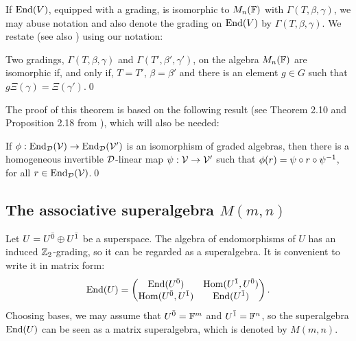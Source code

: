 If $\operatorname{End}(V)$, equipped with a grading, is isomorphic to $M_n(\mathbb{F})$ with $\Gamma(T, \beta, \gamma)$, we may abuse notation and also denote the grading on $\operatorname{End}(V)$ by $\Gamma(T,\beta,\gamma)$.
We restate \cite[Theorem 2.27]{livromicha} (see also \cite[Theorem 2.6]{BK10}) using our notation:

\begin{thm}\label{thm:classification-matrix}%
	Two gradings, $\Gamma(T,\beta,\gamma)$ and $\Gamma(T',\beta',\gamma')$, on the algebra $M_n(\mathbb{F})$ are isomorphic if, and only if, $T=T'$, $\beta=\beta'$ and there is an element $g\in G$ such that $g \Xi(\gamma)=\Xi(\gamma')$.\qed
\end{thm}

The proof of this theorem is based on the following result (see Theorem 2.10 and Proposition 2.18 from \cite{livromicha}), which will also be needed:

\begin{prop}\label{prop:inner-automorphism}
	If $\phi: \operatorname{End}_{\mathcal{D}} (\mathcal V) \rightarrow \operatorname{End}_{\mathcal{D}} (\mathcal V')$ is an isomorphism of graded algebras, then there is a homogeneous invertible 
	$\mathcal{D}$-linear map $\psi: \mathcal V\rightarrow \mathcal V'$ such that $\phi(r)=\psi \circ r \circ \psi^{-1}$, for all $r\in \operatorname{End}_{\mathcal{D}} (\mathcal V)$.\qed
\end{prop}

\subsection{The associative superalgebra $M(m,n)$}\label{M(m,n)}
Let $U = U^{\bar0} \oplus U^{\bar1}$ be a superspace.
The algebra of endomorphisms of $U$ has an induced $\mathbb{Z}_{2}$-grading, so it can be regarded as a superalgebra. It is convenient to write it in matrix form:
%
\begin{equation}\label{eq:End_U}
	\operatorname{End}(U) = \left(\begin{matrix}
	\operatorname{End}(U^{\bar0})       &  \operatorname{Hom}(U^{\bar1},U^{\bar0})\\
	\operatorname{Hom}(U^{\bar0},U^{\bar1}) &  \operatorname{End}(U^{\bar1})\\
	\end{matrix}
	\right).
\end{equation}
%
Choosing bases, we may assume that $U^{\bar0}=\mathbb{F}^m$ and $U^{\bar1}=\mathbb{F}^n$, so the superalgebra $\operatorname{End}(U)$ can be seen as a matrix superalgebra, which is denoted by $M(m,n)$.

